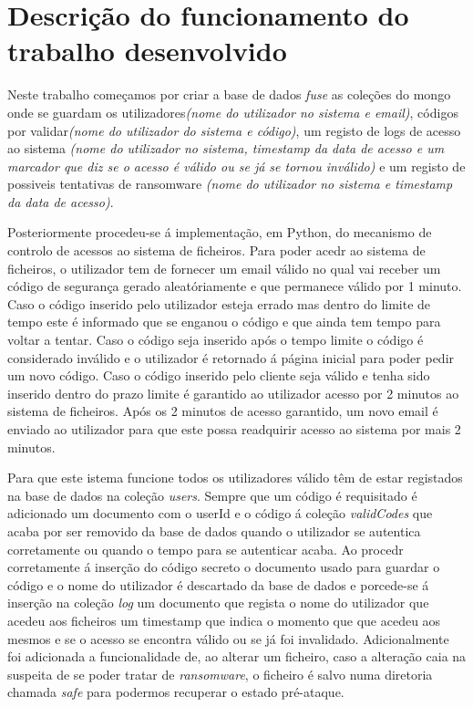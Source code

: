 
 
\section{Descrição do funcionamento do trabalho desenvolvido}

 \par Neste trabalho começamos por criar a base de dados \textit{fuse} as coleções do mongo onde se guardam os utilizadores\textit{(nome do utilizador no sistema e email)}, códigos por validar\textit{(nome do utilizador do sistema e código)}, um registo de logs de acesso ao sistema \textit{(nome do utilizador no sistema, timestamp da data de acesso e um marcador que diz se o acesso é válido ou se já se tornou inválido)} e um registo de possiveis tentativas de ransomware \textit{(nome do utilizador no sistema e timestamp da data de acesso)}.\newline
 \par Posteriormente procedeu-se á implementação, em Python, do mecanismo de controlo de acessos ao sistema de ficheiros. Para poder acedr ao sistema de ficheiros, o utilizador tem de fornecer um email válido no qual vai receber um código de segurança gerado aleatóriamente e que permanece válido por 1 minuto. Caso o código inserido pelo utilizador esteja errado mas dentro do limite de tempo este é informado que se enganou o código e que ainda tem tempo para voltar a tentar. Caso o código seja inserido após o tempo limite o código é considerado inválido e o utilizador é retornado á página inicial para poder pedir um novo código. Caso o código inserido pelo cliente seja válido e tenha sido inserido dentro do prazo limite é garantido ao utilizador acesso por 2 minutos ao sistema de ficheiros. Após os 2 minutos de acesso garantido, um novo email é enviado ao utilizador para que este possa readquirir acesso ao sistema por mais 2 minutos.\newline
 \par Para que este istema funcione todos os utilizadores válido têm de estar registados na base de dados na coleção \textit{users}. Sempre que um código é requisitado é adicionado um documento com o userId e o código á coleção \textit{validCodes} que acaba por ser removido da base de dados quando o utilizador se autentica corretamente ou quando o tempo para se autenticar acaba. Ao procedr corretamente á inserção do código secreto o documento usado para guardar o código  e  o nome do utilizador é descartado da base de dados e porcede-se á inserção na coleção \textit{log} um documento que regista o nome do utilizador que acedeu aos ficheiros um timestamp que indica o momento que que acedeu aos mesmos e se o acesso se encontra válido ou se já foi invalidado. Adicionalmente foi adicionada a funcionalidade de, ao alterar um ficheiro, caso a alteração caia na suspeita de se poder tratar de \textit{ransomware}, o ficheiro é salvo numa diretoria chamada \textit{safe} para podermos recuperar o estado pré-ataque.

